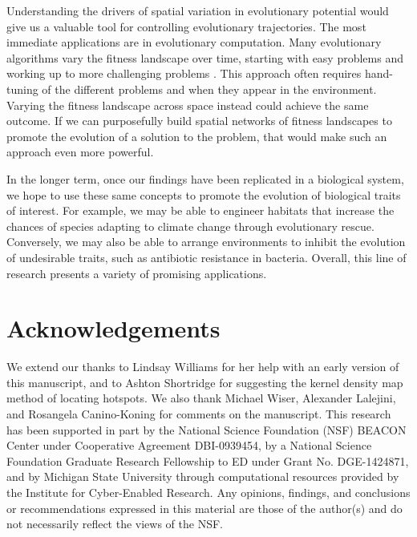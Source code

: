 \documentclass[letterpaper]{article}
\begin{document}
    Understanding the drivers of spatial variation in evolutionary potential would give us a valuable tool for controlling evolutionary trajectories. The most immediate applications are in evolutionary computation. Many evolutionary algorithms vary the fitness landscape over time, starting with easy problems and working up to more challenging problems \citep{hornby_alps:_2006,ovaska_periodical_2009}. This approach often requires hand-tuning of the different problems and when they appear in the environment. Varying the fitness landscape across space instead could achieve the same outcome. If we can purposefully build spatial networks of fitness landscapes to promote the evolution of a solution to the problem, that would make such an approach even more powerful.  
    
    In the longer term, once our findings have been replicated in a biological system, we hope to use these same concepts to promote the evolution of biological traits of interest. For example, we may be able to engineer habitats that increase the chances of species adapting to climate change through evolutionary rescue. Conversely, we may also be able to arrange environments to inhibit the evolution of undesirable traits, such as antibiotic resistance in bacteria. Overall, this line of research presents a variety of promising applications. 


\section{Acknowledgements}

We extend our thanks to Lindsay Williams for her help with an early version of this manuscript, and to Ashton Shortridge for suggesting the kernel density map method of locating hotspots. We also thank Michael Wiser, Alexander Lalejini, and Rosangela Canino-Koning for comments on the manuscript. This research has been supported in part by the National Science Foundation (NSF) BEACON Center under Cooperative Agreement DBI-0939454, by a National Science Foundation Graduate Research Fellowship to ED under Grant No. DGE-1424871, and by Michigan State University through computational resources provided by the Institute for Cyber-Enabled Research. Any opinions, findings, and conclusions or recommendations expressed in this material are those of the author(s) and do not necessarily reflect the views of the NSF.


\footnotesize

\end{document}
